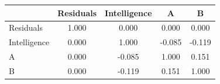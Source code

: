 \begin{tabular}{l*{4}{c}}
\toprule
            &   Residuals&Intelligence&           A&           B\\
\midrule
Residuals   &       1.000&       0.000&       0.000&       0.000\\
Intelligence&       0.000&       1.000&      -0.085&      -0.119\\
A           &       0.000&      -0.085&       1.000&       0.151\\
B           &       0.000&      -0.119&       0.151&       1.000\\
\bottomrule
\end{tabular}
